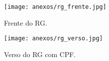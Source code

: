 \begin{anexosenv}
	\partanexos
	\begin{figure}
		\texttt{[image: anexos/rg\_frente.jpg]}
		\caption[rg frente]{Frente do RG.}
		\label{fig:mv1}
	\end{figure}
	
	\begin{figure}
		\texttt{[image: anexos/rg\_verso.jpg]}
		\caption[rg verso]{Verso do RG com CPF.}
		\label{fig:mv2}
	\end{figure}
	
	
	
	
\end{anexosenv}